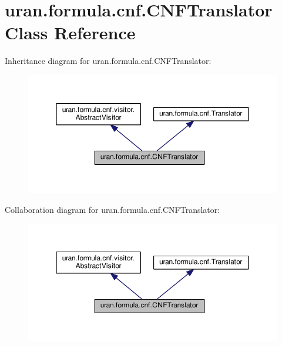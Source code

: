 \hypertarget{classuran_1_1formula_1_1cnf_1_1_c_n_f_translator}{}\section{uran.\+formula.\+cnf.\+C\+N\+F\+Translator Class Reference}
\label{classuran_1_1formula_1_1cnf_1_1_c_n_f_translator}


Inheritance diagram for uran.\+formula.\+cnf.\+C\+N\+F\+Translator\+:
\nopagebreak
\begin{figure}[H]
\begin{center}
\leavevmode
\includegraphics[width=350pt]{classuran_1_1formula_1_1cnf_1_1_c_n_f_translator__inherit__graph}
\end{center}
\end{figure}


Collaboration diagram for uran.\+formula.\+cnf.\+C\+N\+F\+Translator\+:
\nopagebreak
\begin{figure}[H]
\begin{center}
\leavevmode
\includegraphics[width=350pt]{classuran_1_1formula_1_1cnf_1_1_c_n_f_translator__coll__graph}
\end{center}
\end{figure}
